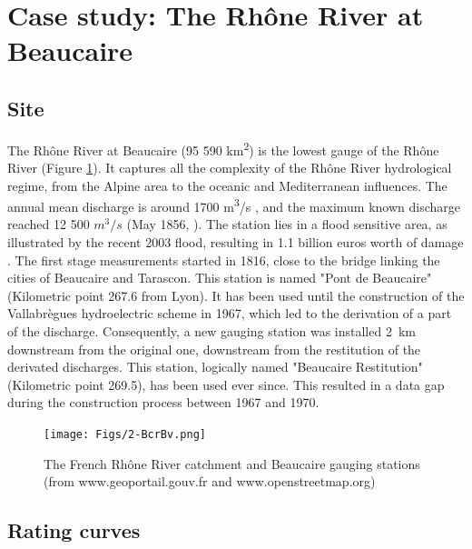 \documentclass[11pt]{article}
\begin{document}
\section{Case study: The Rhône River at Beaucaire}
\label{sec:Bcr}
    \subsection{Site}
    
    The Rhône River at Beaucaire (95 590 km\textsuperscript{2}) is the lowest gauge of the Rhône River (Figure \ref{fig:locstations}). It captures all the complexity of the Rhône River hydrological regime, from the Alpine area to the oceanic and Mediterranean influences. The annual mean discharge is around 1700 m\textsuperscript{3}/s \citep{bard_actualisation_2018}, and the maximum known discharge reached 12 500 $m^3/s$ (May 1856, \citet{lang_les_2014}). The station lies in a flood sensitive area, as illustrated by the recent 2003 flood, resulting in 1.1 billion euros worth of damage \citep{lang_les_2014}. 
    The first stage measurements started in 1816, close to the bridge linking the cities of Beaucaire and Tarascon. This station is named "Pont de Beaucaire" (Kilometric point 267.6 from Lyon). It has been used until the construction of the Vallabrègues hydroelectric scheme in 1967, which led to the derivation of a part of the discharge. Consequently, a new gauging station was installed 2~km downstream from the original one, downstream from the restitution of the derivated discharges. This station, logically named "Beaucaire Restitution" (Kilometric point 269.5), has been used ever since. This resulted in a data gap during the construction process between 1967 and 1970.

    \begin{figure}[h!]
        \centering
        \texttt{[image: Figs/2-BcrBv.png]}
        \caption{The French Rhône River catchment and Beaucaire gauging stations (from www.geoportail.gouv.fr and www.openstreetmap.org)}
        \label{fig:locstations}
    \end{figure}
 
    \subsection{Rating curves}
    \label{sec:prior_elicitation}
       
\end{document}

